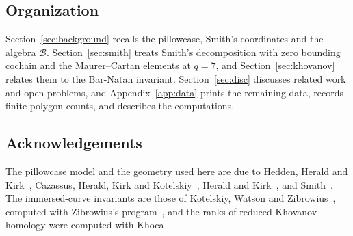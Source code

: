 \subsection{Organization}
Section~\ref{sec:background} recalls the pillowcase, Smith's coordinates and the algebra $\mathcal B$.
Section~\ref{sec:smith} treats Smith's decomposition with zero bounding cochain and the Maurer--Cartan
elements at $q=7$, and Section~\ref{sec:khovanov} relates them to the Bar-Natan invariant.
Section~\ref{sec:disc} discusses related work and open problems, and Appendix~\ref{app:data} prints the
remaining data, records finite polygon counts, and describes the computations.

\subsection*{Acknowledgements}
The pillowcase model and the geometry used here are due to Hedden, Herald and Kirk~\cite{HHK1,HHK2},
Cazassus, Herald, Kirk and Kotelskiy~\cite{CHKK}, Herald and Kirk~\cite{HK}, and Smith~\cite{Smith}. The
immersed-curve invariants are those of Kotelskiy, Watson and Zibrowius~\cite{KWZ}, computed with Zibrowius's
program~\cite{Zibkht}, and the ranks of reduced Khovanov homology were computed with Khoca~\cite{Khoca}.
